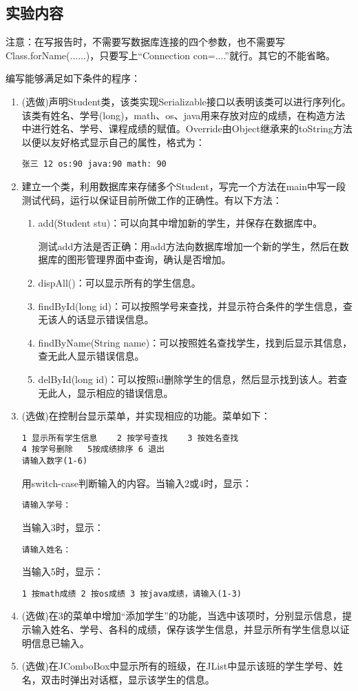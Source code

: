﻿\documentclass[cs5size,b5paper,nofonts,twoside]{ctexart}
\begin{document}
\subsection{实验内容}
注意：在写报告时，不需要写数据库连接的四个参数，也不需要写Class.forName(......)，只要写上“Connection con=....”就行。其它的不能省略。

编写能够满足如下条件的程序：
\begin{enumerate}
\item (选做)声明Student类，该类实现Serializable接口以表明该类可以进行序列化。该类有姓名、学号(long)，math、os、java用来存放对应的成绩，在构造方法中进行姓名、学号、课程成绩的赋值。Override由Object继承来的toString方法以便以友好格式显示自己的属性，格式为：
     \begin{verbatim}张三 12 os:90 java:90 math: 90 \end{verbatim}
\item 建立一个类，利用数据库来存储多个Student，写完一个方法在main中写一段测试代码，运行以保证目前所做工作的正确性。有以下方法：
\begin{enumerate}
     \item add(Student stu)：可以向其中增加新的学生，并保存在数据库中。

	 测试add方法是否正确：用add方法向数据库增加一个新的学生，然后在数据库的图形管理界面中查询，确认是否增加。
     \item dispAll()：可以显示所有的学生信息。
     \item findById(long id)：可以按照学号来查找，并显示符合条件的学生信息，查无该人的话显示错误信息。
     \item findByName(String name)：可以按照姓名查找学生，找到后显示其信息，查无此人显示错误信息。
     \item delById(long id)：可以按照id删除学生的信息，然后显示找到该人。若查无此人，显示相应的错误信息。
\end{enumerate}
\item (选做)在控制台显示菜单，并实现相应的功能。菜单如下：
   \begin{verbatim}1 显示所有学生信息    2 按学号查找    3 按姓名查找
4 按学号删除   5按成绩排序 6 退出
请输入数字(1-6)\end{verbatim}
   用switch-case判断输入的内容。当输入2或4时，显示：
      \begin{verbatim}请输入学号：\end{verbatim}
   当输入3时，显示：
      \begin{verbatim}请输入姓名：\end{verbatim}
   当输入5时，显示：
      \begin{verbatim}1 按math成绩 2 按os成绩 3 按java成绩，请输入(1-3)\end{verbatim}
\item (选做)在3的菜单中增加“添加学生”的功能，当选中该项时，分别显示信息，提示输入姓名、学号、各科的成绩，保存该学生信息，并显示所有学生信息以证明信息已输入。
\item (选做)在JComboBox中显示所有的班级，在JList中显示该班的学生学号、姓名，双击时弹出对话框，显示该学生的信息。
\end{enumerate}
\end{document}
